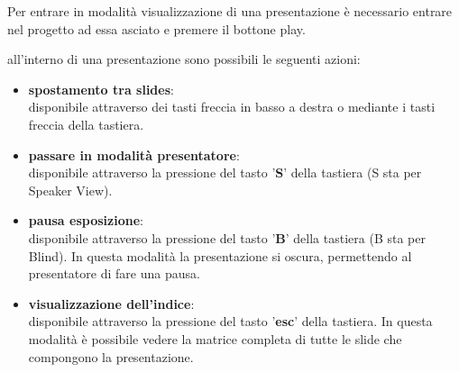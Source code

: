 \noindent
Per entrare in modalità visualizzazione di una presentazione è necessario entrare nel progetto ad essa asciato e premere il bottone play. 

all'interno di una presentazione sono possibili le seguenti azioni:

\begin{itemize}
 \item \textbf{spostamento tra slides}: \\disponibile attraverso dei tasti freccia in basso a destra o mediante i tasti freccia della tastiera.
 \item \textbf{passare in modalità presentatore}: \\disponibile attraverso la pressione del tasto '\textbf{S}' della tastiera (S sta per Speaker View).
  \item \textbf{pausa esposizione}: \\disponibile attraverso la pressione del tasto '\textbf{B}' della tastiera (B sta per Blind). In questa modalità la presentazione si oscura, permettendo al presentatore di fare una pausa.
  \item \textbf{visualizzazione dell'indice}: \\disponibile attraverso la pressione del tasto '\textbf{esc}' della tastiera. In questa modalità è possibile vedere la matrice completa di tutte le slide che compongono la presentazione.

  \end{itemize}
